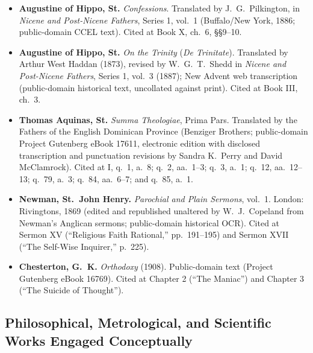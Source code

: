 \begin{itemize}
\item \textbf{Augustine of Hippo, St.} \emph{Confessions}. Translated by J.\ G.\ Pilkington, in \emph{Nicene and Post-Nicene Fathers}, Series 1, vol.\ 1 (Buffalo/New York, 1886; public-domain CCEL text). Cited at Book X, ch.\ 6, \S\S 9--10.
\item \textbf{Augustine of Hippo, St.} \emph{On the Trinity} (\emph{De Trinitate}). Translated by Arthur West Haddan (1873), revised by W.\ G.\ T.\ Shedd in \emph{Nicene and Post-Nicene Fathers}, Series 1, vol.\ 3 (1887); New Advent web transcription (public-domain historical text, uncollated against print). Cited at Book III, ch.\ 3.
\item \textbf{Thomas Aquinas, St.} \emph{Summa Theologiae}, Prima Pars. Translated by the Fathers of the English Dominican Province (Benziger Brothers; public-domain Project Gutenberg eBook 17611, electronic edition with disclosed transcription and punctuation revisions by Sandra K.\ Perry and David McClamrock). Cited at I, q.\ 1, a.\ 8; q.\ 2, aa.\ 1--3; q.\ 3, a.\ 1; q.\ 12, aa.\ 12--13; q.\ 79, a.\ 3; q.\ 84, aa.\ 6--7; and q.\ 85, a.\ 1.
\item \textbf{Newman, St.\ John Henry.} \emph{Parochial and Plain Sermons}, vol.\ 1. London: Rivingtons, 1869 (edited and republished unaltered by W.\ J.\ Copeland from Newman's Anglican sermons; public-domain historical OCR). Cited at Sermon XV (``Religious Faith Rational,'' pp.~191--195) and Sermon XVII (``The Self-Wise Inquirer,'' p.~225).
\item \textbf{Chesterton, G.\ K.} \emph{Orthodoxy} (1908). Public-domain text (Project Gutenberg eBook 16769). Cited at Chapter 2 (``The Maniac'') and Chapter 3 (``The Suicide of Thought'').
\end{itemize}

\subsection*{Philosophical, Metrological, and Scientific Works Engaged Conceptually}

